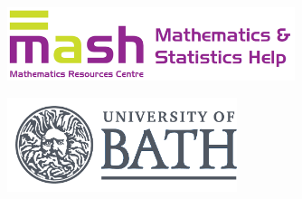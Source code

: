 \documentclass[
  letterpaper,
  DIV=11,
  numbers=noendperiod]{scrartcl}
\begin{document}
\begin{figure}

\begin{minipage}{0.50\linewidth}
\includegraphics[width=0.75\textwidth,height=\textheight]{./images/MASH-logo.png}\\
\end{minipage}%
%
\begin{minipage}{0.50\linewidth}
\includegraphics[width=0.6\textwidth,height=\textheight]{./images/uob-logo-grey-transparent.png}\\
\end{minipage}%

\end{figure}%
\end{document}
